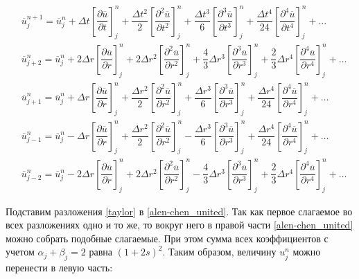 \begin{equation} \label{taylor}
\begin{split}
	&\overline{u}_j^{n+1} = \overline{u}_j^n + \Delta t \left[ \dfrac{\partial \overline{u}}{\partial t} \right]_j^n + \dfrac{\Delta t^2}{2} \left[ \dfrac{\partial^2 \overline{u}}{\partial t^2} \right]_j^n +
	\dfrac{\Delta t^3}{6} \left[ \dfrac{\partial^3 \overline{u}}{\partial t^3} \right]_j^n +
	\dfrac{\Delta t^4}{24} \left[ \dfrac{\partial^4 \overline{u}}{\partial t^4} \right]_j^n + \dots \\
	&\overline{u}_{j+2}^n = \overline{u}_j^n + 2\Delta r 
	\left[ \dfrac{\partial \overline{u}}{\partial r} \right]_j^n +
	2 \Delta r^2 \left[ \dfrac{\partial^2 \overline{u}}{\partial r^2} \right]_j^n + \dfrac{4}{3}\Delta r^3
	\left[ \dfrac{\partial^3 \overline{u}}{\partial r^3} \right]_j^n + \dfrac{2}{3}\Delta r^4 
	\left[ \dfrac{\partial^4 \overline{u}}{\partial r^4} \right]_j^n + \dots \\
	&\overline{u}_{j+1}^n = \overline{u}_j^n + \Delta r \left[ \dfrac{\partial \overline{u}}{\partial r} \right]_j^n + \dfrac{\Delta r^2}{2} \left[ \dfrac{\partial^2 \overline{u}}{\partial r^2} \right]_j^n +
	\dfrac{\Delta r^3}{6} \left[ \dfrac{\partial^3 \overline{u}}{\partial r^3} \right]_j^n +
	\dfrac{\Delta r^4}{24} \left[ \dfrac{\partial^4 \overline{u}}{\partial r^4} \right]_j^n + \dots \\
	&\overline{u}_{j-1}^n = \overline{u}_j^n - \Delta r \left[ \dfrac{\partial \overline{u}}{\partial r} \right]_j^n + \dfrac{\Delta r^2}{2} \left[ \dfrac{\partial^2 \overline{u}}{\partial r^2} \right]_j^n -
	\dfrac{\Delta r^3}{6} \left[ \dfrac{\partial^3 \overline{u}}{\partial r^3} \right]_j^n +
	\dfrac{\Delta r^4}{24} \left[ \dfrac{\partial^4 \overline{u}}{\partial r^4} \right]_j^n + \dots \\
	&\overline{u}_{j-2}^n = \overline{u}_j^n - 2\Delta r \left[ \dfrac{\partial \overline{u}}{\partial r} \right]_j^n + 2\Delta r^2 \left[ \dfrac{\partial^2 \overline{u}}{\partial r^2} \right]_j^n -
	\dfrac{4}{3}\Delta r^3 \left[ \dfrac{\partial^3 \overline{u}}{\partial r^3} \right]_j^n +
	\dfrac{2}{3}\Delta r^4 \left[ \dfrac{\partial^4 \overline{u}}{\partial r^4} \right]_j^n + \dots
\end{split}
\end{equation}

Подставим разложения \eqref{taylor} в \eqref{alen-chen_united}.
Так как первое слагаемое во всех разложениях одно и то же, то вокруг него в правой части \eqref{alen-chen_united} можно собрать подобные слагаемые. При этом сумма всех коэффициентов с учетом $\alpha_j + \beta_j = 2$ равна $(1 + 2s)^2$. Таким образом, величину $u_j^n$ можно перенести в левую часть:

